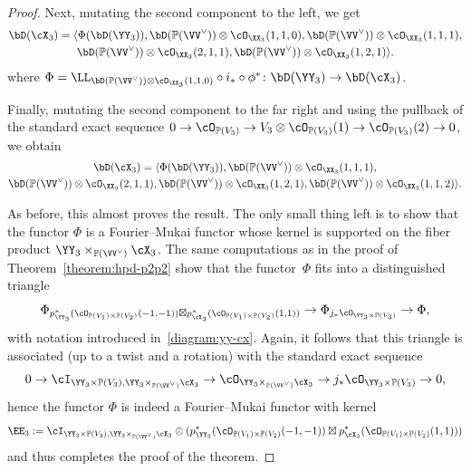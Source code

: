\documentclass[11pt]{amsart}
\renewcommand{\P}{{\mathbb{P}}}
\theoremstyle{plain}
\theoremstyle{definition}
\theoremstyle{remark}
\begin{document}
\begin{proof}
Next, mutating the second component to the left, we get
\begin{multline*}
\bD({\cX_3}) = \langle \Phi(\bD({\YY_3})), \bD(\P(\VV^\vee)) \otimes \cO_{\XX_3}(1,1,0), \bD(\P(\VV^\vee)) \otimes \cO_{\XX_3}(1,1,1), \\ \bD(\P(\VV^\vee)) \otimes \cO_{\XX_3}(2,1,1), \bD(\P(\VV^\vee)) \otimes \cO_{\XX_3}(1,2,1) \rangle.
\end{multline*}
where $\Phi = \LL_{\bD(\P(\VV^\vee)) \otimes \cO_{\XX_3}(1,1,0)} \circ i_* \circ \phi^* \colon \bD({\YY_3}) \to \bD({\cX_3})$.

Finally, mutating the second component to the far right and using the pullback 
of the standard exact sequence $0 \to \cO_{\P(V_3)} \to V_3 \otimes \cO_{\P(V_3)}(1) \to \cO_{\P(V_3)}(2) \to 0$, we obtain
\begin{multline}\label{eq:dbxx6}
\bD({\cX_3}) = \langle \Phi(\bD({\YY_3})), \bD(\P(\VV^\vee)) \otimes \cO_{\XX_3}(1,1,1), \\ \bD(\P(\VV^\vee)) \otimes \cO_{\XX_3}(2,1,1), \bD(\P(\VV^\vee)) \otimes \cO_{\XX_3}(1,2,1), \bD(\P(\VV^\vee)) \otimes \cO_{\XX_3}(1,1,2) \rangle.
\end{multline}

As before, this almost proves the result. 
The only small thing left is to show that the functor $\Phi$ is a Fourier--Mukai functor 
whose kernel is supported on the fiber product ${\YY_3} \times_{\P(\VV^\vee)} {\cX_3}$.
The same computations as in the proof of Theorem~\ref{theorem:hpd-p2p2} show that the functor~$\Phi$ fits into a distinguished triangle
\begin{equation*}
\Phi_{p_{\YY_3}^*(\cO_{\P(V_1) \times \P(V_2)}(-1,-1)) \boxtimes p_{\cX_3}^*(\cO_{\P(V_1) \times \P(V_2)}(1,1))} \to \Phi_{j_*\cO_{{\YY_3} \times \P(V_3)}} \to \Phi,
\end{equation*}
with notation introduced in~\eqref{diagram:yy-cx}.
Again, it follows that this triangle is associated (up to a twist and a rotation) with the standard exact sequence
\begin{equation*}
0 \to \cI_{{\YY_3} \times \P(V_3), {\YY_3} \times_{\P(\VV^\vee)} {\cX_3}} \to \cO_{{\YY_3} \times_{\P(\VV^\vee)} {\cX_3}} \to j_*\cO_{{\YY_3} \times \P(V_3)} \to 0,
\end{equation*}
hence 
the functor $\Phi$ is indeed a Fourier--Mukai functor with kernel
\begin{equation}\label{eq:hpd-kernel-xxx3}
\EE_3 := \cI_{{\YY_3} \times \P(V_3), {\YY_3} \times_{\P(\VV^\vee)} {\cX_3}} \otimes (p_{\YY_3}^*(\cO_{\P(V_1) \times \P(V_2)}(-1,-1)) \boxtimes p_{\cX_3}^*(\cO_{\P(V_1) \times \P(V_2)}(1,1)))
\end{equation}
and thus completes the proof of the theorem.
\end{proof}
\end{document}

